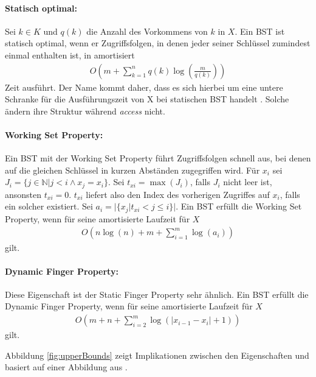 \documentclass[a4paper,12pt]{article}
\begin{document}
\paragraph{Statisch optimal:}
Sei $k \in K$ und $q(k)$ die Anzahl des Vorkommens von $k$ in  $X$. Ein BST ist statisch optimal, wenn er Zugriffsfolgen, in denen jeder seiner Schlüssel zumindest einmal enthalten ist, in amortisiert 
\begin{align*}
O\left(m +\sum_{k = 1}^{n}q(k)\log \left( \frac{m}{q(k)} \right)\right) 
\end{align*}
Zeit ausführt. Der Name kommt daher, dass es sich hierbei um eine untere Schranke für die Ausführungszeit von X bei statischen BST handelt \cite{staticOptimal}. Solche ändern ihre Struktur während \textit{access} nicht.

\paragraph{Working Set Property:}
Ein BST mit der Working Set Property führt Zugriffsfolgen schnell aus, bei denen auf die gleichen Schlüssel in kurzen Abständen zugegriffen wird.
Für $x_i$ sei $J_i = \{j \in \mathbb{N} \vert j < i \land x_j = x_i \}$.
Sei $t_{xi} = \max \left(J_i\right)$, falls $J_i$ nicht leer ist, ansonsten $t_{xi} = 0$. $t_{xi}$ liefert also den Index des vorherigen Zugriffes auf $x_i$, falls ein solcher existiert. Sei ${a_i = \vert\{x_j \vert t_{xi} < j \leq i   \} \vert }$.
Ein BST erfüllt die Working Set Property, wenn für seine amortisierte Laufzeit für $X$
\begin{align*}
O\left(n \log\left( n\right) + m +\sum_{i = 1}^{m} \log \left(a_i\right) \right)
\end{align*} 
gilt. 


\paragraph{Dynamic Finger Property:}
Diese Eigenschaft ist der Static Finger Property sehr ähnlich.
Ein BST erfüllt die Dynamic Finger Property, wenn für seine amortisierte Laufzeit für $X$
\begin{align*}
O\left( m + n + \sum_{i = 2}^{m} \log \left(\vert x_{i-1} - x_i  \vert	+ 1	\right)\right)
\end{align*} 
gilt. 

\noindent Abbildung \ref{fig:upperBounds} zeigt Implikationen zwischen den Eigenschaften und basiert auf einer Abbildung aus \cite{upperBounds}.
\end{document}
